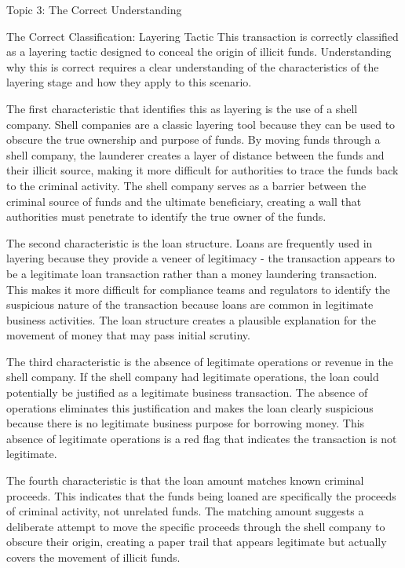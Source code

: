 \documentclass[5pt]{beamer}
\begin{document}
	\begin{frame}{Topic 3: The Correct Understanding}
		\begin{block}{\tiny The Correct Classification: Layering Tactic}
			\tiny This transaction is correctly classified as a layering tactic designed to conceal the origin of illicit funds. Understanding why this is correct requires a clear understanding of the characteristics of the layering stage and how they apply to this scenario.
			
			The first characteristic that identifies this as layering is the use of a shell company. Shell companies are a classic layering tool because they can be used to obscure the true ownership and purpose of funds. By moving funds through a shell company, the launderer creates a layer of distance between the funds and their illicit source, making it more difficult for authorities to trace the funds back to the criminal activity. The shell company serves as a barrier between the criminal source of funds and the ultimate beneficiary, creating a wall that authorities must penetrate to identify the true owner of the funds.
			
			The second characteristic is the loan structure. Loans are frequently used in layering because they provide a veneer of legitimacy - the transaction appears to be a legitimate loan transaction rather than a money laundering transaction. This makes it more difficult for compliance teams and regulators to identify the suspicious nature of the transaction because loans are common in legitimate business activities. The loan structure creates a plausible explanation for the movement of money that may pass initial scrutiny.
			
			The third characteristic is the absence of legitimate operations or revenue in the shell company. If the shell company had legitimate operations, the loan could potentially be justified as a legitimate business transaction. The absence of operations eliminates this justification and makes the loan clearly suspicious because there is no legitimate business purpose for borrowing money. This absence of legitimate operations is a red flag that indicates the transaction is not legitimate.
			
			The fourth characteristic is that the loan amount matches known criminal proceeds. This indicates that the funds being loaned are specifically the proceeds of criminal activity, not unrelated funds. The matching amount suggests a deliberate attempt to move the specific proceeds through the shell company to obscure their origin, creating a paper trail that appears legitimate but actually covers the movement of illicit funds.
		\end{block}
		

\end{frame}
\end{document}
